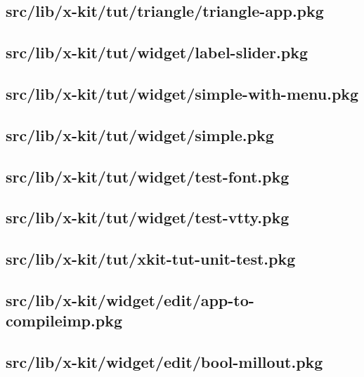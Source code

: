 \subsection{src/lib/x-kit/tut/triangle/triangle-app.pkg}


\subsection{src/lib/x-kit/tut/widget/label-slider.pkg}


\subsection{src/lib/x-kit/tut/widget/simple-with-menu.pkg}


\subsection{src/lib/x-kit/tut/widget/simple.pkg}


\subsection{src/lib/x-kit/tut/widget/test-font.pkg}


\subsection{src/lib/x-kit/tut/widget/test-vtty.pkg}


\subsection{src/lib/x-kit/tut/xkit-tut-unit-test.pkg}


\subsection{src/lib/x-kit/widget/edit/app-to-compileimp.pkg}


\subsection{src/lib/x-kit/widget/edit/bool-millout.pkg}


